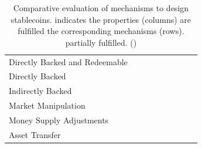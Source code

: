 \begin{table}[htb!]
\centering

	\begin{tabular}{ lllllllll}

&
\headrow{Corrects undervaluation} &
\headrow{Corrects overvaluation} &
\headrow{Decentralized issuance } &
\headrow{Decentralized redemption} &
\headrow{Decentralized transfer} &
\headrow{No trusted oracle} &
\headrow{TBD} \\

		\hline

		Directly Backed and Redeemable	  & \multicolumn{1}{|c|}{\full } & \multicolumn{1}{c|}{ \full }   & \multicolumn{1}{c|}{} & \multicolumn{1}{c|}{} & \multicolumn{1}{c|}{} & \multicolumn{1}{c|}{} &   \\
		Directly Backed                                   & \multicolumn{1}{|c|}{ } & \multicolumn{1}{c|}{}   & \multicolumn{1}{c|}{ } & \multicolumn{1}{c|}{} & \multicolumn{1}{c|}{} & \multicolumn{1}{c|}{} &   \\
		Indirectly Backed                                 & \multicolumn{1}{|c|}{ } & \multicolumn{1}{c|}{}   & \multicolumn{1}{c|}{ } & \multicolumn{1}{c|}{} & \multicolumn{1}{c|}{} & \multicolumn{1}{c|}{} &   \\      \hline
		Market Manipulation                             & \multicolumn{1}{|c|}{ } & \multicolumn{1}{c|}{}   & \multicolumn{1}{c|}{ } & \multicolumn{1}{c|}{} & \multicolumn{1}{c|}{} & \multicolumn{1}{c|}{} &   \\
		Money Supply Adjustments                  & \multicolumn{1}{|c|}{ } & \multicolumn{1}{c|}{}   & \multicolumn{1}{c|}{ } & \multicolumn{1}{c|}{} & \multicolumn{1}{c|}{} & \multicolumn{1}{c|}{} &   \\
		Asset Transfer	                                  & \multicolumn{1}{|c|}{ } & \multicolumn{1}{c|}{}   & \multicolumn{1}{c|}{ } & \multicolumn{1}{c|}{} & \multicolumn{1}{c|}{} & \multicolumn{1}{c|}{} &   \\

		\hline

	\end{tabular}
	\caption{Comparative evaluation of mechanisms to design stablecoins. {\full} indicates the properties (columns) are fulfilled the corresponding mechanisms (rows). {\prt} partially fulfilled. ()
	\label{tab:evframework}}

\end{table}
